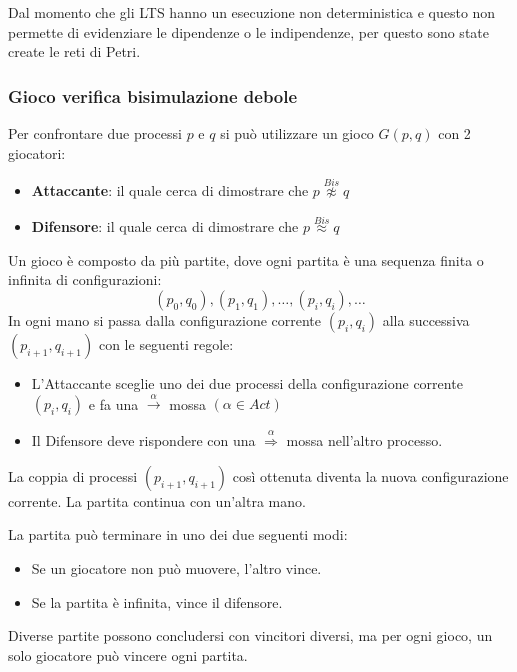Dal momento che gli LTS hanno un esecuzione non deterministica e questo
non permette di evidenziare le dipendenze o le indipendenze, per questo sono
state create le reti di Petri.
\subsubsection{Gioco verifica bisimulazione debole}
Per confrontare due processi $p$ e $q$ si può utilizzare un gioco $G(p, q)$ con
2 giocatori:
\begin{itemize}
    \item \textbf{Attaccante}: il quale cerca di dimostrare che $p
              \stackrel{Bis}{\not\approx} q$
    \item \textbf{Difensore}: il quale cerca di dimostrare che $p
              \stackrel{Bis}{\approx} q$
\end{itemize}
Un gioco è composto da più partite, dove ogni partita è una sequenza finita o
infinita di configurazioni: $$(p_0, q_0), (p_1, q_1), \dots, (p_i, q_i), \dots$$
In ogni mano si passa dalla configurazione corrente $(p_i, q_i)$ alla successiva
$(p_{i + 1}, q_{i + 1})$ con le seguenti regole:
\begin{itemize}
    \item L'Attaccante sceglie uno dei due processi della configurazione corrente
          $(p_i, q_i)$ e fa una $\xrightarrow{\alpha}$ mossa $(\alpha \in Act)$
    \item Il Difensore deve rispondere con una $\stackrel{\alpha}{\Rightarrow}$
          mossa nell'altro processo.
\end{itemize}
La coppia di processi $(p_{i+1}, q_{i+1})$ così ottenuta diventa la nuova
configurazione corrente. La partita continua con un'altra mano.

La partita può terminare in uno dei due seguenti modi:
\begin{itemize}
    \item Se un giocatore non può muovere, l'altro vince.
    \item Se la partita è infinita, vince il difensore.
\end{itemize}
Diverse partite possono concludersi con vincitori diversi, ma per ogni gioco, un
solo giocatore può vincere ogni partita.

